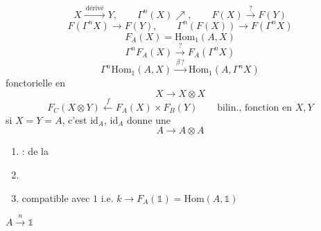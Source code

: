 \documentclass[11pt,a4paper]{article}
\begin{document}
\[
  X \xrightarrow{\ \text{dérivé}\ } Y, \qquad \Gamma^{n}(X) \nearrow, \qquad F(X) \overset{?}{\longrightarrow} F(Y)
\]
\[
  F(\Gamma^{n}X) \longrightarrow F(Y), \qquad \Gamma^{n}(F(X)) \longrightarrow F(\Gamma^{n}X)
\]
\[
  F_{A}(X) = \mathrm{Hom}_{1}(A, X)
\]
\[
  \Gamma^{n}F_{A}(X) \overset{?}{\longrightarrow} F_{A}(\Gamma^{n}X)
\]
\[
  \Gamma^{n}\mathrm{Hom}_{1}(A, X) \xrightarrow{\ \beta\,?\ } \mathrm{Hom}_{1}(A, \Gamma^{n}X)
\]
 fonctorielle en \ill{}
\[
  X \longrightarrow X \otimes X
\]
\[
  F_{C}(X \otimes Y) \xleftarrow{\ f\ } F_{A}(X) \times F_{B}(Y) \qquad \text{bilin., fonction en } X, Y
\]
si $X = Y = A$, c'est \ill{} $\mathrm{id}_{A}$, $\mathrm{id}_{A}$ donne une 
\[
  A \longrightarrow A \otimes A
\]
\begin{enumerate}
  \item[a)]   :  de la  \ill{}
  \item[b)]  
  \item[c)] compatible avec $1$ \quad i.e. $k \to F_{A}(\mathbb{1}) = \mathrm{Hom}(A, \mathbb{1})$
\end{enumerate}
  \quad $A \xrightarrow{\ n\ } \mathbb{1}$
\end{document}
